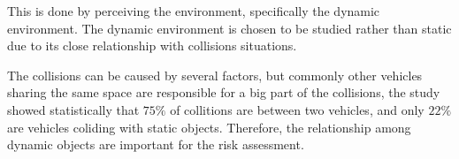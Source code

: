 This is done by perceiving the environment, specifically the dynamic environment. The dynamic environment is chosen to be studied rather than static due to its close relationship with  collisions situations. 

The collisions can be caused by several factors, but commonly other vehicles sharing the same space are responsible for a big part of the collisions, the study \cite{Hurt_1981} showed statistically that $75\%$ of collitions are between two vehicles, and only $22\%$ are vehicles coliding with static objects. Therefore, the relationship among dynamic objects are important for the risk assessment.
